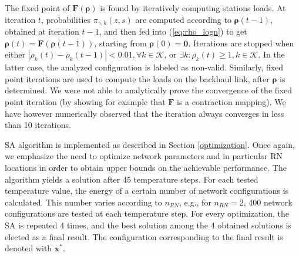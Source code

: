 \documentclass[draftcls,onecolumn]{IEEEtran}
\theoremstyle{plain}
\theoremstyle{definition}
\begin{document}
The fixed point of $\boldsymbol{F}(\boldsymbol{\rho})$ is found by iteratively computing stations loads. At iteration $t$, probabilities $\pi_{\gamma,k}(z,s)$ are computed according to $\boldsymbol{\rho}(t-1)$, obtained at iteration $t-1$, and then fed into (\ref{eq:rho_logn}) to get $\boldsymbol{\rho}(t){=}\boldsymbol{F}(\boldsymbol{\rho}(t-1))$, starting from $\boldsymbol{\rho}(0)=\boldsymbol{0}$. Iterations are stopped when either $|\rho_k(t)-\rho_k(t-1)|{<}0.01, \forall k \in \mathcal{K}$, or $\exists  k : \rho_k(t)\geq 1, k \in \mathcal{K}$. In the latter case, the analyzed configuration is labeled as non-valid.  
Similarly, fixed point iterations are used to compute the loads on the backhaul link, after $\boldsymbol{\rho}$ is determined. We were not able to analytically prove the convergence of the fixed point iteration (by showing for example that $\boldsymbol{F}$ is a contraction mapping). We have however numerically observed that the iteration always converges in less than 10 iterations.

SA algorithm is implemented as described in Section \ref{optimization}. Once again, we emphasize the need to optimize network parameters and in particular RN locations in order to obtain upper bounds on the achievable performance. The algorithm yields a solution after 45 temperature steps. For each tested temperature value, the energy of a certain number of network configurations is calculated. This number varies according to $n_{RN}$, e.g., for $n_{RN}=2$, 400 network configurations are tested at each temperature step. 
For every optimization, the SA is repeated 4 times, and the best solution among the 4 obtained solutions is elected as a final result. The configuration corresponding to the final result is denoted with $\boldsymbol{x}^*$. 
\end{document}
